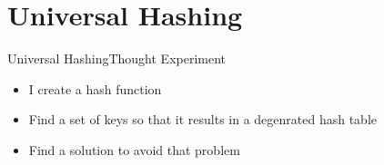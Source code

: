 \section{Universal Hashing}


\begin{frame}{Universal Hashing}{Thought Experiment}
  \begin{itemize}
    \item
      I create a hash function
    \item
      Find a set of keys so that it results in a degenrated hash table
    \item
      Find a solution to avoid that problem
  \end{itemize}
\end{frame}


